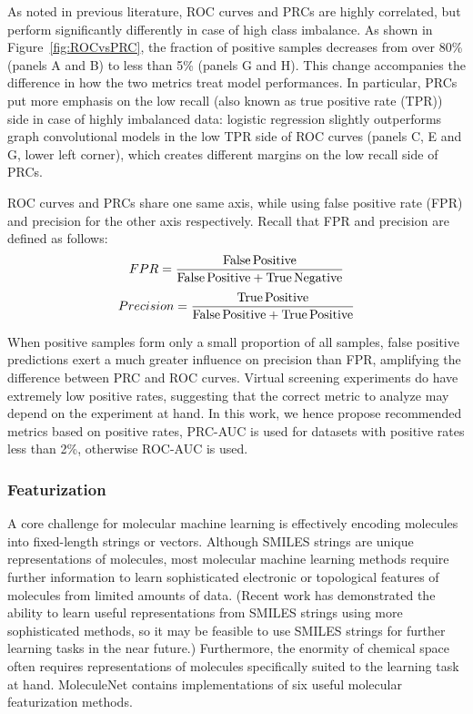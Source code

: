 As noted in previous literature\cite{PRC}, ROC curves and PRCs are highly correlated, but perform significantly differently in case of high class imbalance. As shown in Figure~\ref{fig:ROCvsPRC}, the fraction of positive samples decreases from over 80\% (panels A and B) to less than 5\% (panels G and H). This change accompanies the difference in how the two metrics treat model performances. In particular, PRCs put more emphasis on the low recall (also known as true positive rate (TPR)) side in case of highly imbalanced data: logistic regression slightly outperforms graph convolutional models in the low TPR side of ROC curves (panels C, E and G, lower left corner), which creates different margins on the low recall side of PRCs.

ROC curves and PRCs share one same axis, while using false positive rate (FPR) and precision for the other axis respectively. Recall that FPR and precision are defined as follows:
\begin{equation*}
    \small
    FPR=\frac{\rm{False\,Positive}}{\rm{False\,Positive} + \rm{True\,Negative}}
\end{equation*}
\begin{equation*}
    \small
    Precision=\frac{\rm{True\,Positive}}{\rm{False\,Positive} + \rm{True\,Positive}}
\end{equation*}

When positive samples form only a small proportion of all samples, false positive predictions exert a much greater influence on precision than FPR, amplifying the difference between PRC and ROC curves. Virtual screening experiments do have extremely low positive rates, suggesting that the correct metric to analyze may depend on the experiment at hand. In this work, we hence propose recommended metrics based on positive rates, PRC-AUC is used for datasets with positive rates less than 2\%, otherwise ROC-AUC is used. 


\subsubsection{Featurization}

A core challenge for molecular machine learning is effectively encoding molecules into fixed-length strings or vectors. Although SMILES strings are unique representations of molecules, most molecular machine learning methods require further information to learn sophisticated electronic or topological features of molecules from limited amounts of data. (Recent work has demonstrated the ability to learn useful representations from SMILES strings using more sophisticated methods\cite{gomez2016automatic}, so it may be feasible to use SMILES strings for further learning tasks in the near future.) Furthermore, the enormity of chemical space often requires representations of molecules specifically suited to the learning task at hand. MoleculeNet contains implementations of six useful molecular featurization methods.

